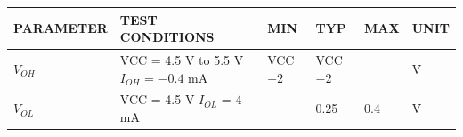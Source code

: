 {\setlength{\tabcolsep}{3pt}\begin{tabular}{llllll}\toprule
PARAMETER & TEST CONDITIONS & MIN & TYP & MAX & UNIT\\\midrule
$V_{OH}$ & \shortstack[l]{VCC = 4.5 V to 5.5 V\\$I_{OH}$ = $-0.4$ mA} & VCC $-2$ & VCC $-2$ & & V\\
$V_{OL}$ & \shortstack[l]{VCC = 4.5 V\\$I_{OL}$ = 4 mA} & & 0.25 & 0.4 & V\\\bottomrule
\end{tabular}}
